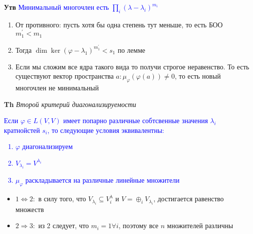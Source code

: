 \textbf{Утв} \textcolor{blue}{Минимальный многочлен есть $\prod_i (\lambda - \lambda_i)^{m_i}$}

\begin{enumerate}
    \item От противного: пусть хотя бы одна степень тут меньше, то есть БОО $m_1^{'} < m_1$
    \item Тогда $\dim \ker (\varphi - \lambda_1)^{m_1^{'}} < s_1$ по лемме
    \item Если мы сложим все ядра такого вида то получи строгое неравенство.
    То есть существуют вектор пространства $a: \mu_\varphi (\varphi(a)) \neq 0$, то есть новый многочлен не минимальный
\end{enumerate}

\textbf{Th} \textit{Второй критерий диагонализируемости}

\textcolor{blue}{Если $\varphi \in L(V, V)$ имеет попарно различные собтсвенные значения $\lambda_i$
    кратнойстей $s_i$, то следующие условия эквивалентны:
    \begin{enumerate}
        \item $\varphi$ диагонализируем
        \item $V_{\lambda_i} = V^{\lambda_i}$
        \item $\mu_\varphi$ раскладывается на различные линейные множители
    \end{enumerate}
                }

\begin{itemize}
    \item $1 \Leftrightarrow 2:$ в силу того, что $V_\lambda_i \subseteq V^\lambda_i$ и $V = \oplus_i V_{\lambda
    _i}$, достигается равенство множеств
    \item $2 \Rightarrow 3:$ из 2 следует, что $m_i = 1 \forall i$, поэтому все $n$ множителей различны
\end{itemize}